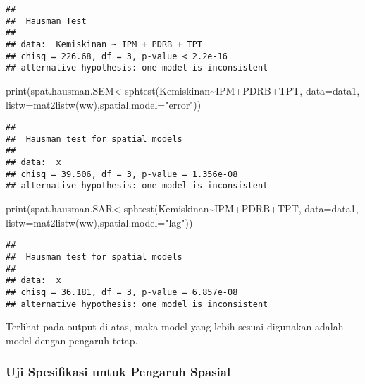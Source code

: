 \documentclass[
]{book}
\newenvironment{Shaded}{\begin{snugshade}}{\end{snugshade}}
\newcommand{\AttributeTok}[1]{\textcolor[rgb]{0.77,0.63,0.00}{#1}}
\newcommand{\FunctionTok}[1]{\textcolor[rgb]{0.00,0.00,0.00}{#1}}
\newcommand{\NormalTok}[1]{#1}
\newcommand{\OtherTok}[1]{\textcolor[rgb]{0.56,0.35,0.01}{#1}}
\newcommand{\SpecialCharTok}[1]{\textcolor[rgb]{0.00,0.00,0.00}{#1}}
\newcommand{\StringTok}[1]{\textcolor[rgb]{0.31,0.60,0.02}{#1}}
\begin{document}
\begin{verbatim}
## 
##  Hausman Test
## 
## data:  Kemiskinan ~ IPM + PDRB + TPT
## chisq = 226.68, df = 3, p-value < 2.2e-16
## alternative hypothesis: one model is inconsistent
\end{verbatim}

\begin{Shaded}
\begin{Highlighting}[]
\FunctionTok{print}\NormalTok{(spat.hausman.SEM}\OtherTok{\textless{}{-}}\FunctionTok{sphtest}\NormalTok{(Kemiskinan}\SpecialCharTok{\textasciitilde{}}\NormalTok{IPM}\SpecialCharTok{+}\NormalTok{PDRB}\SpecialCharTok{+}\NormalTok{TPT, }\AttributeTok{data=}\NormalTok{data1, }\AttributeTok{listw=}\FunctionTok{mat2listw}\NormalTok{(ww),}\AttributeTok{spatial.model=}\StringTok{"error"}\NormalTok{))}
\end{Highlighting}
\end{Shaded}

\begin{verbatim}
## 
##  Hausman test for spatial models
## 
## data:  x
## chisq = 39.506, df = 3, p-value = 1.356e-08
## alternative hypothesis: one model is inconsistent
\end{verbatim}

\begin{Shaded}
\begin{Highlighting}[]
\FunctionTok{print}\NormalTok{(spat.hausman.SAR}\OtherTok{\textless{}{-}}\FunctionTok{sphtest}\NormalTok{(Kemiskinan}\SpecialCharTok{\textasciitilde{}}\NormalTok{IPM}\SpecialCharTok{+}\NormalTok{PDRB}\SpecialCharTok{+}\NormalTok{TPT, }\AttributeTok{data=}\NormalTok{data1, }\AttributeTok{listw=}\FunctionTok{mat2listw}\NormalTok{(ww),}\AttributeTok{spatial.model=}\StringTok{"lag"}\NormalTok{))}
\end{Highlighting}
\end{Shaded}

\begin{verbatim}
## 
##  Hausman test for spatial models
## 
## data:  x
## chisq = 36.181, df = 3, p-value = 6.857e-08
## alternative hypothesis: one model is inconsistent
\end{verbatim}

Terlihat pada output di atas, maka model yang lebih sesuai digunakan adalah model dengan pengaruh tetap.

\hypertarget{uji-spesifikasi-untuk-pengaruh-spasial}{%
\subsubsection{Uji Spesifikasi untuk Pengaruh Spasial}\label{uji-spesifikasi-untuk-pengaruh-spasial}}
\end{document}
